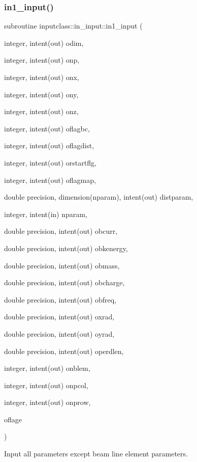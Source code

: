 \subsubsection{\texorpdfstring{in1\_input()}{in1\_input()}}
{\footnotesize\ttfamily subroutine inputclass\+::in\+\_\+input\+::in1\+\_\+input (\begin{DoxyParamCaption}\item[{integer, intent(out)}]{odim,  }\item[{integer, intent(out)}]{onp,  }\item[{integer, intent(out)}]{onx,  }\item[{integer, intent(out)}]{ony,  }\item[{integer, intent(out)}]{onz,  }\item[{integer, intent(out)}]{oflagbc,  }\item[{integer, intent(out)}]{oflagdist,  }\item[{integer, intent(out)}]{orstartflg,  }\item[{integer, intent(out)}]{oflagmap,  }\item[{double precision, dimension(nparam), intent(out)}]{distparam,  }\item[{integer, intent(in)}]{nparam,  }\item[{double precision, intent(out)}]{obcurr,  }\item[{double precision, intent(out)}]{obkenergy,  }\item[{double precision, intent(out)}]{obmass,  }\item[{double precision, intent(out)}]{obcharge,  }\item[{double precision, intent(out)}]{obfreq,  }\item[{double precision, intent(out)}]{oxrad,  }\item[{double precision, intent(out)}]{oyrad,  }\item[{double precision, intent(out)}]{operdlen,  }\item[{integer, intent(out)}]{onblem,  }\item[{integer, intent(out)}]{onpcol,  }\item[{integer, intent(out)}]{onprow,  }\item[{}]{oflage }\end{DoxyParamCaption})}



Input all parameters except beam line element parameters. 

\mbox{\label{interfaceinputclass_1_1in__input_a1c3359c483146c1c034a2a7b9da6791f}} 
